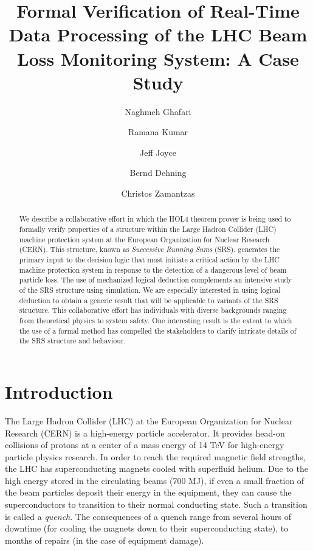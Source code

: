 \documentclass{llncs}
\begin{document}
\thispagestyle{empty}
\title{Formal Verification of Real-Time Data Processing of the LHC Beam Loss Monitoring System: A Case Study}
\author{Naghmeh Ghafari  \and Ramana Kumar  \and Jeff Joyce 
  \and Bernd Dehning  \and Christos Zamantzas  }

\pagestyle{plain}

\maketitle

\begin{abstract}

We describe a collaborative effort in which the HOL4 theorem prover is being used to formally verify properties of a structure within the Large Hadron Collider (LHC) machine protection system at the European Organization for Nuclear Research (CERN).
This structure, known as \emph{Successive Running Sums} (SRS), generates the primary input to the decision logic that must initiate a critical action by the LHC machine protection system in response to the detection of a dangerous level of beam particle loss.
The use of mechanized logical deduction complements an intensive study of the SRS structure using simulation.
We are especially interested in using logical deduction to obtain a generic result that will be applicable to variants of the SRS structure.
This collaborative effort has individuals with diverse backgrounds ranging from theoretical physics to system safety.
One interesting result is the extent to which the use of a formal method has compelled the stakeholders to clarify intricate details of the SRS structure and behaviour.

\end{abstract}

\section{Introduction}

The Large Hadron Collider (LHC) at the European Organization for Nuclear Research (CERN) is a high-energy particle accelerator.
It provides head-on collisions of protons at a center of a mass energy of 14 TeV for high-energy particle physics research.
In order to reach the required magnetic field strengths, the LHC has superconducting magnets cooled with superfluid helium.
Due to the high energy stored in the circulating beams (700 MJ), if even a small fraction of the beam particles deposit their energy in the equipment, they can cause the superconductors to transition to their normal conducting state.
Such a transition is called a \emph{quench}.
The consequences of a quench range from several hours of downtime (for cooling the magnets down to their superconducting state), to months of repairs (in the case of equipment damage).
\end{document}
